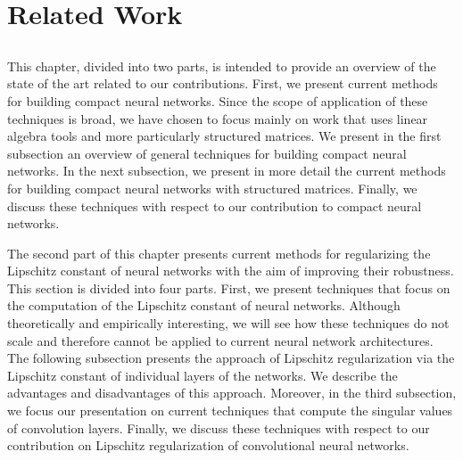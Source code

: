 \chapter{Related Work}
\label{chapter:ch3-related_work}
\localtoc

\section*{}

This chapter, divided into two parts, is intended to provide an overview of the state of the art related to our contributions.
First, we present current methods for building compact neural networks.
Since the scope of application of these techniques is broad, we have chosen to focus mainly on work that uses linear algebra tools and more particularly structured matrices. 
We present in the first subsection an overview of general techniques for building compact neural networks.
In the next subsection, we present in more detail the current methods for building compact neural networks with structured matrices.
Finally, we discuss these techniques with respect to our contribution to compact neural networks.

The second part of this chapter presents current methods for regularizing the Lipschitz constant of neural networks with the aim of improving their robustness.
This section is divided into four parts.
First, we present techniques that focus on the computation of the Lipschitz constant of neural networks.
Although theoretically and empirically interesting, we will see how these techniques do not scale and therefore cannot be applied to current neural network architectures.
The following subsection presents the approach of Lipschitz regularization via the Lipschitz constant of individual layers of the networks.
We describe the advantages and disadvantages of this approach.
Moreover, in the third subsection, we focus our presentation on current techniques that compute the singular values of convolution layers.
Finally, we discuss these techniques with respect to our contribution on Lipschitz regularization of convolutional neural networks.




